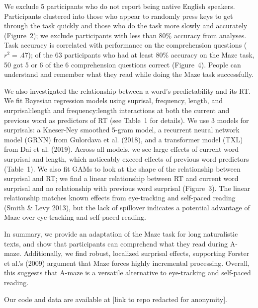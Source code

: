 \documentclass[11pt,a4paper]{article}
\begin{document}
We exclude 5 participants who do not report being native English speakers. Participants clustered into those who appear to randomly press keys to get through the task quickly and those who do the task more slowly and accurately (Figure~2); we exclude participants with less than 80\% accuracy from analyses. Task accuracy is correlated with performance on the comprehension questions ($r^2=.47$); of the 63 participants who had at least 80\% accuracy on the Maze task, 50 got 5 or 6 of the 6 comprehension questions correct (Figure~4). People can understand and remember what they read while doing the Maze task successfully.

We also investigated the relationship between a word's predictability and its RT. We fit Bayesian regression models using suprisal, frequency, length, and surprisal:length and frequency:length interactions at both the current and previous word as predictors of RT (see Table~1 for details). We use 3 models for surprisals: a Kneser-Ney smoothed 5-gram model, a recurrent neural network model (GRNN) from Gulordava et al. (2018), and a transformer model (TXL) from Dai et al. (2019). Across all models, we see large effects of current word surprisal and length, which noticeably exceed effects of previous word predictors (Table~1). We also fit GAMs to look at the shape of the relationship between surprisal and RT; we find a linear relationship between RT and current word surprisal and no relationship with previous word surprisal (Figure~3). The linear relationship matches known effects from eye-tracking and self-paced reading (Smith \& Levy 2013), but the lack of spillover indicates a potential advantage of Maze over eye-tracking and self-paced reading.


In summary, we provide an adaptation of the Maze task for long naturalistic texts, and show that participants can comprehend what they read during A-maze. Additionally, we find robust, localized surprisal effects, supporting Forster et al.'s (2009) argument that Maze forces highly incremental processing. Overall, this suggests that A-maze is a versatile alternative to eye-tracking and self-paced reading. 

Our code and data are available at [link to repo redacted for anonymity]. 

%
\end{document}
